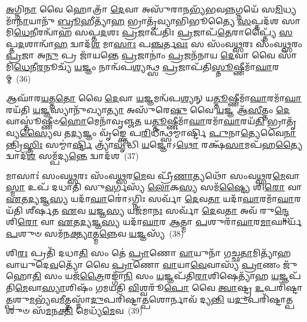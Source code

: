 {\anuvakamend[{𑌵\-\ul{𑌸𑍂}\-𑌨𑌿𑌤𑌿᳴ 𑌪𑍍𑌰\-\ul{𑌸}\-𑌵 𑌇\-\ul{𑌤𑍍𑌯}\-𑌦𑍍𑌭𑍍𑌯𑍋॑\-𑌽𑌨𑍍𑌤\-\ul{𑌰}\-𑌤 \ul{𑌏}\-𑌵𑍈\-\ul{𑌨}\-𑌨𑍍𑌦𑌶᳴ 𑌚}]}%

\-\ul{𑌅}\-𑌗𑍍𑌨𑌿\-\ul{𑌨𑌾} 𑌵𑍈 𑌹𑍋𑌤𑍍𑌰𑌾᳴ \ul{𑌦𑍇}\-𑌵𑌾 𑌅𑌸𑍁᳴𑌰𑌾\-\ul{𑌨}\-𑌭𑍍𑌯᳴𑌭𑌵\-\ul{𑌨𑍍𑌨}\-𑌗𑍍𑌨𑌯𑍇᳴ 𑌸\-\ul{𑌮𑌿}\-𑌧𑍍𑌯𑌮𑌾᳴\-\ul{𑌨𑌾}\-𑌯𑌾𑌨𑍁᳴ \ul{𑌬𑍍𑌰𑍂}\-𑌹𑍀𑌤𑍍𑌯𑌾᳴\-\ul{𑌹} 𑌭𑍍𑌰𑌾𑌤𑍃᳴𑌵𑍍𑌯𑌾𑌭𑌿𑌭𑍂𑌤𑍍𑌯𑍈 \ul{𑌸}\-𑌪𑍍𑌤𑌦᳴𑌶 𑌸𑌾𑌮𑌿\-\ul{𑌧𑍇}\-𑌨𑍀𑌰𑌨𑍍𑌵𑌾᳴𑌹 𑌸𑌪𑍍𑌤\-\ul{𑌦}\-𑌶𑌃 \ul{𑌪𑍍𑌰}\-𑌜𑌾𑌪᳴𑌤𑌿𑌃 \ul{𑌪𑍍𑌰}\-𑌜𑌾𑌪᳴\-\ul{𑌤𑍇}\-𑌰𑌾𑌪𑍍𑌤𑍍𑌯𑍈᳴ \ul{𑌸}\-𑌪𑍍𑌤\-\ul{𑌦}\-𑌶𑌾𑌨𑍍𑌵𑌾᳴\-\ul{𑌹} 𑌦𑍍𑌵𑌾𑌦᳴\-\ul{𑌶} 𑌮𑌾\-\ul{𑌸𑌾𑌃} 𑌪\-\ul{𑌞𑍍𑌚}\-𑌰𑍍𑌤\-\ul{𑌵𑌃} 𑌸 𑌸𑌂᳴𑌵\-\ul{𑌥𑍍𑌸}\-𑌰𑌃 𑌸𑌂᳴𑌵\-\ul{𑌥𑍍𑌸}\-𑌰𑌂 \ul{𑌪𑍍𑌰}\-𑌜𑌾 𑌅\-\ul{𑌨𑍁} 𑌪𑍍𑌰 𑌜𑌾᳴𑌯𑌨𑍍𑌤𑍇 \ul{𑌪𑍍𑌰}\-𑌜𑌾𑌨𑌾𑌂॑ \ul{𑌪𑍍𑌰}\-𑌜𑌨᳴𑌨𑌾𑌯 \ul{𑌦𑍇}\-𑌵𑌾 𑌵𑍈 𑌸𑌾᳴𑌮𑌿\-\ul{𑌧𑍇}\-𑌨𑍀\-\ul{𑌰}\-𑌨𑍂𑌚𑍍𑌯᳴ \ul{𑌯}\-𑌜𑍍𑌞𑌂 𑌨𑌾𑌨𑍍𑌵᳴𑌪\-\ul{𑌶𑍍𑌯}\-𑌨𑍍𑌥𑍍𑌸 \ul{𑌪𑍍𑌰}\-𑌜𑌾𑌪᳴𑌤𑌿\-\ul{𑌸𑍍𑌤𑍂}\-𑌷𑍍𑌣𑍀𑌮𑌾᳴\-\ul{𑌘𑌾}\-𑌰𑌮𑍍~(36)

𑌆𑌘𑌾᳴𑌰\-\ul{𑌯}\-𑌤𑍍𑌤\-\ul{𑌤𑍋} 𑌵𑍈 \ul{𑌦𑍇}\-𑌵𑌾 \ul{𑌯}\-𑌜𑍍𑌞𑌮𑌨𑍍𑌵᳴𑌪\-\ul{𑌶𑍍𑌯}\-𑌨𑍍 𑌯\-\ul{𑌤𑍍𑌤𑍂}\-𑌷𑍍𑌣𑍀𑌮𑌾᳴\-\ul{𑌘𑌾}\-𑌰𑌮𑌾᳴\-\ul{𑌘𑌾}\-𑌰𑌯᳴𑌤𑌿 \ul{𑌯}\-𑌜𑍍𑌞𑌸𑍍𑌯𑌾𑌨𑍁᳴𑌖𑍍𑌯𑌾\-\ul{𑌤𑍍𑌯𑌾} 𑌅𑌸𑍁᳴𑌰𑍇\-\ul{𑌷𑍁} 𑌵𑍈 \ul{𑌯}\-𑌜𑍍𑌞 𑌆᳴\-\ul{𑌸𑍀}\-𑌤𑍍𑌤𑌂 \ul{𑌦𑍇}\-𑌵𑌾𑌸𑍍𑌤𑍂॑𑌷𑍍𑌣𑍀𑍞\-\ul{𑌹𑍋}\-𑌮𑍇𑌨𑌾᳴𑌵𑍃𑌞𑍍𑌜\-\ul{𑌤} 𑌯\-\ul{𑌤𑍍𑌤𑍂}\-𑌷𑍍𑌣𑍀𑌮𑌾᳴\-\ul{𑌘𑌾}\-𑌰𑌮𑌾᳴\-\ul{𑌘𑌾}\-𑌰𑌯᳴\-\ul{𑌤𑌿} 𑌭𑍍𑌰𑌾𑌤𑍃᳴𑌵𑍍𑌯\-\ul{𑌸𑍍𑌯𑍈}\-𑌵 𑌤\-\ul{𑌦𑍍𑌯}\-𑌜𑍍𑌞𑌂 𑌵𑍃᳴𑌙𑍍𑌕𑍍𑌤𑍇 𑌪\-\ul{𑌰𑌿}\-𑌧𑍀𑌨𑍍𑌥𑍍𑌸𑌮𑍍𑌮𑌾॑𑌰𑍍𑌷𑍍𑌟𑌿 \ul{𑌪𑍁}\-𑌨𑌾\-\ul{𑌤𑍍𑌯𑍇}\-𑌵𑍈\-\ul{𑌨𑌾}\-𑌨𑍍𑌤𑍍𑌰𑌿\-\ul{𑌸𑍍𑌤𑍍𑌰𑌿𑌃} 𑌸𑌮𑍍𑌮𑌾॑\-\ul{𑌰𑍍𑌷𑍍𑌟𑌿} 𑌤𑍍𑌰𑍍𑌯𑌾᳴\-\ul{𑌵𑍃}\-𑌦𑍍𑌧𑌿 \ul{𑌯}\-𑌜𑍍𑌞𑍋\-𑌽\-\ul{𑌥𑍋} 𑌰𑌕𑍍𑌷᳴\-\ul{𑌸𑌾}\-𑌮𑌪᳴𑌹\-\ul{𑌤𑍍𑌯𑍈} 𑌦𑍍𑌵𑌾𑌦᳴\-\ul{𑌶} 𑌸𑌮𑍍𑌪᳴𑌦𑍍𑌯\-\ul{𑌨𑍍𑌤𑍇} 𑌦𑍍𑌵𑌾𑌦᳴𑌶~(37)

𑌮𑌾𑌸𑌾𑌃॑ 𑌸𑌂𑌵\-\ul{𑌥𑍍𑌸}\-𑌰𑌃 𑌸𑌂᳴𑌵\-\ul{𑌥𑍍𑌸}\-𑌰\-\ul{𑌮𑍇}\-𑌵 𑌪𑍍𑌰𑍀᳴\-\ul{𑌣𑌾}\-𑌤𑍍𑌯𑌥𑍋᳴ 𑌸𑌂𑌵\-\ul{𑌥𑍍𑌸}\-𑌰\-\ul{𑌮𑍇}\-𑌵𑌾\-\ul{𑌸𑍍𑌮𑌾} 𑌉𑌪᳴ 𑌦𑌧𑌾𑌤𑌿 𑌸𑍁\-\ul{𑌵}\-𑌰𑍍𑌗𑌸𑍍𑌯᳴ \ul{𑌲𑍋}\-𑌕\-\ul{𑌸𑍍𑌯} 𑌸𑌮᳴\-\ul{𑌷𑍍𑌟𑍍𑌯𑍈} 𑌶𑌿\-\ul{𑌰𑍋} 𑌵𑌾 \ul{𑌏}\-𑌤\-\ul{𑌦𑍍𑌯}\-𑌜𑍍𑌞\-\ul{𑌸𑍍𑌯} 𑌯𑌦𑌾᳴\-\ul{𑌘𑌾}\-𑌰𑍋॑\-𑌽𑌗𑍍𑌨𑌿𑌃 𑌸𑌰𑍍𑌵𑌾᳴ \ul{𑌦𑍇}\-𑌵\-\ul{𑌤𑌾} 𑌯𑌦𑌾᳴\-\ul{𑌘𑌾}\-𑌰𑌮𑌾᳴\-\ul{𑌘𑌾}\-𑌰𑌯᳴𑌤𑌿 𑌶𑍀𑌰𑍍\mbox{}\-\ul{𑌷}\-𑌤 \ul{𑌏}\-𑌵 \ul{𑌯}\-𑌜𑍍𑌞\-\ul{𑌸𑍍𑌯} 𑌯𑌜᳴𑌮𑌾\-\ul{𑌨𑌃} 𑌸𑌰𑍍𑌵𑌾᳴ \ul{𑌦𑍇}\-𑌵\-\ul{𑌤𑌾} 𑌅𑌵᳴ 𑌰𑍁\-\ul{𑌨𑍍𑌦𑍍𑌧𑍇} 𑌶𑌿\-\ul{𑌰𑍋} 𑌵𑌾 \ul{𑌏}\-𑌤\-\ul{𑌦𑍍𑌯}\-𑌜𑍍𑌞\-\ul{𑌸𑍍𑌯} 𑌯𑌦𑌾᳴\-\ul{𑌘𑌾}\-𑌰 \ul{𑌆}\-𑌤𑍍𑌮𑌾 \ul{𑌪}\-𑌶𑍁𑌰𑌾᳴\-\ul{𑌘𑌾}\-𑌰\-\ul{𑌮𑌾}\-𑌘𑌾𑌰𑍍𑌯᳴ \ul{𑌪}\-𑌶𑍁𑍞 𑌸𑌮᳴𑌨\-\ul{𑌕𑍍𑌤𑍍𑌯𑌾}\-𑌤𑍍𑌮\-\ul{𑌨𑍍𑌨𑍇}\-𑌵 \ul{𑌯}\-𑌜𑍍𑌞𑌸𑍍𑌯᳴~(38)

𑌶𑌿\-\ul{𑌰𑌃} 𑌪𑍍𑌰𑌤𑌿᳴ 𑌦𑌧𑌾\-\ul{𑌤𑌿} 𑌸𑌂 𑌤𑍇॑ \ul{𑌪𑍍𑌰𑌾}\-𑌣𑍋 \ul{𑌵𑌾}\-𑌯𑍁𑌨𑌾᳴ 𑌗𑌚𑍍𑌛\-\ul{𑌤𑌾}\-𑌮𑌿𑌤𑍍𑌯𑌾᳴𑌹 𑌵𑌾𑌯𑍁𑌦𑍇\-\ul{𑌵}\-𑌤𑍍𑌯𑍋᳴ 𑌵𑍈 \ul{𑌪𑍍𑌰𑌾}\-𑌣𑍋 \ul{𑌵𑌾}\-𑌯𑌾\-\ul{𑌵𑍇}\-𑌵𑌾𑌸𑍍𑌯᳴ \ul{𑌪𑍍𑌰𑌾}\-𑌣𑌂 𑌜𑍁᳴𑌹𑍋\-\ul{𑌤𑌿} 𑌸𑌂 𑌯𑌜᳴\-\ul{𑌤𑍍𑌰𑍈}\-𑌰𑌙𑍍𑌗𑌾᳴\-\ul{𑌨𑌿} 𑌸𑌂 \ul{𑌯}\-𑌜𑍍𑌞𑌪᳴𑌤𑌿\-\ul{𑌰𑌾}\-𑌶𑌿𑌷𑍇𑌤𑍍𑌯𑌾᳴𑌹 \ul{𑌯}\-𑌜𑍍𑌞𑌪᳴𑌤𑌿\-\ul{𑌮𑍇}\-𑌵𑌾\-\ul{𑌸𑍍𑌯𑌾}\-𑌶𑌿𑌷𑌂᳴ 𑌗𑌮𑌯𑌤𑌿 \ul{𑌵𑌿}\-𑌶𑍍𑌵𑌰𑍂᳴\-\ul{𑌪𑍋} 𑌵𑍈 \ul{𑌤𑍍𑌵𑌾}\-𑌷𑍍𑌟𑍍𑌰 \ul{𑌉}\-𑌪𑌰𑌿᳴𑌷𑍍𑌟𑌾\-\ul{𑌤𑍍𑌪}\-𑌶𑍁\-\ul{𑌮}\-𑌭𑍍𑌯᳴𑌵\-\ul{𑌮𑍀}\-𑌤𑍍𑌤𑌸𑍍𑌮𑌾᳴\-\ul{𑌦𑍁}\-𑌪𑌰𑌿᳴𑌷𑍍𑌟𑌾\-\ul{𑌤𑍍𑌪}\-𑌶𑍋𑌰𑍍𑌨𑌾𑌵᳴ 𑌦𑍍𑌯\-\ul{𑌨𑍍𑌤𑌿} 𑌯\-\ul{𑌦𑍁}\-𑌪𑌰𑌿᳴𑌷𑍍𑌟𑌾\-\ul{𑌤𑍍𑌪}\-𑌶𑍁𑍞 𑌸᳴\-\ul{𑌮}\-𑌨\-\ul{𑌕𑍍𑌤𑌿} 𑌮𑍇𑌧𑍍𑌯᳴\-\ul{𑌮𑍇}\-𑌵~(39)

